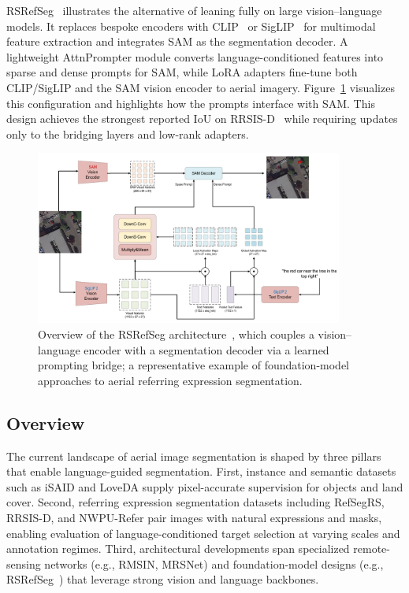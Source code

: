 RSRefSeg~\cite{chen2025rsrefseg} illustrates the alternative of leaning fully on large vision–language models. It replaces bespoke encoders with CLIP~\cite{clip} or SigLIP~\cite{siglip} for multimodal feature extraction and integrates SAM as the segmentation decoder. A lightweight AttnPrompter module converts language-conditioned features into sparse and dense prompts for SAM, while LoRA adapters fine-tune both CLIP/SigLIP and the SAM vision encoder to aerial imagery. Figure~\ref{fig:rsrefseg_arch} visualizes this configuration and highlights how the prompts interface with SAM. This design achieves the strongest reported IoU on RRSIS-D~\cite{liu2024rotated,chen2025rsrefseg} while requiring updates only to the bridging layers and low-rank adapters.
\begin{figure}[t]
\centering
\includegraphics[width=0.9\textwidth]{./images/rsrefseg.png}
\caption{Overview of the RSRefSeg architecture~\cite{chen2025rsrefseg}, which couples a vision–language encoder with a segmentation decoder via a learned prompting bridge; a representative example of foundation-model approaches to aerial referring expression segmentation.}
\label{fig:rsrefseg_arch}
\end{figure}

\subsection{Overview}

The current landscape of aerial image segmentation is shaped by three pillars that enable language-guided segmentation. First, instance and semantic datasets such as iSAID and LoveDA supply pixel-accurate supervision for objects and land cover. Second, referring expression segmentation datasets including RefSegRS, RRSIS-D, and NWPU-Refer pair images with natural expressions and masks, enabling evaluation of language-conditioned target selection at varying scales and annotation regimes. Third, architectural developments span specialized remote-sensing networks (e.g., RMSIN, MRSNet) and foundation-model designs (e.g., RSRefSeg~\cite{chen2025rsrefseg}) that leverage strong vision and language backbones.

